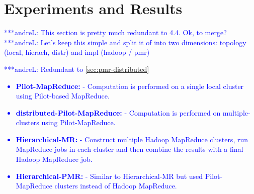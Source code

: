 \documentclass{acm_proc_article-sp}
\newcommand{\alnote}[1]{ {\textcolor{blue} { ***andreL: #1 }}}
\newcommand{\alnote}[1]{}
\newcommand{\pilotmapreduce}{Pilot-MapReduce\xspace}
\begin{document}

\section{Experiments and Results}
\label{sec-experiments}


\alnote{This section is pretty much redundant to 4.4. Ok, to merge?}
\alnote{Let's keep this simple and split it of into two dimensions:
  topology (local, hierach, distr) and impl (hadoop / pmr)}

\alnote{Redundant to \ref{sec:pmr-distributed}\begin{itemize}
\item \textbf{\pilotmapreduce:}  - Computation is performed on a single local cluster using Pilot-based MapReduce.
\item \textbf{distributed-\pilotmapreduce:} - Computation is performed on multiple-clusters using \pilotmapreduce.
\item \textbf{Hierarchical-MR:} - Construct multiple Hadoop MapReduce clusters, run MapReduce jobs in each cluster and then combine the results with a final Hadoop MapReduce job. 
\item \textbf{Hierarchical-PMR:} - Similar to Hierarchical-MR but used \pilotmapreduce clusters instead of Hadoop MapReduce.
\end{itemize}}
\end{document}
